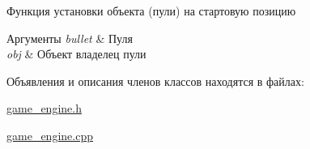 Функция установки объекта (пули) на стартовую позицию 


\begin{DoxyParams}{Аргументы}
{\em bullet} & Пуля \\
\hline
{\em obj} & Объект владелец пули \\
\hline
\end{DoxyParams}


Объявления и описания членов классов находятся в файлах\+:\begin{DoxyCompactItemize}
\item 
\mbox{\hyperlink{game__engine_8h}{game\+\_\+engine.\+h}}\item 
\mbox{\hyperlink{game__engine_8cpp}{game\+\_\+engine.\+cpp}}\end{DoxyCompactItemize}
